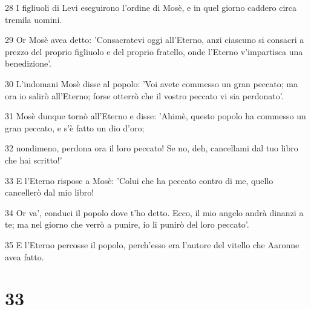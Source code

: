 \par 28 I figliuoli di Levi eseguirono l'ordine di Mosè, e in quel giorno caddero circa tremila uomini.
\par 29 Or Mosè avea detto: 'Consacratevi oggi all'Eterno, anzi ciascuno si consacri a prezzo del proprio figliuolo e del proprio fratello, onde l'Eterno v'impartisca una benedizione'.
\par 30 L'indomani Mosè disse al popolo: 'Voi avete commesso un gran peccato; ma ora io salirò all'Eterno; forse otterrò che il vostro peccato vi sia perdonato'.
\par 31 Mosè dunque tornò all'Eterno e disse: 'Ahimè, questo popolo ha commesso un gran peccato, e s'è fatto un dio d'oro;
\par 32 nondimeno, perdona ora il loro peccato! Se no, deh, cancellami dal tuo libro che hai scritto!'
\par 33 E l'Eterno rispose a Mosè: 'Colui che ha peccato contro di me, quello cancellerò dal mio libro!
\par 34 Or va', conduci il popolo dove t'ho detto. Ecco, il mio angelo andrà dinanzi a te; ma nel giorno che verrò a punire, io li punirò del loro peccato'.
\par 35 E l'Eterno percosse il popolo, perch'esso era l'autore del vitello che Aaronne avea fatto.

\chapter{33}

